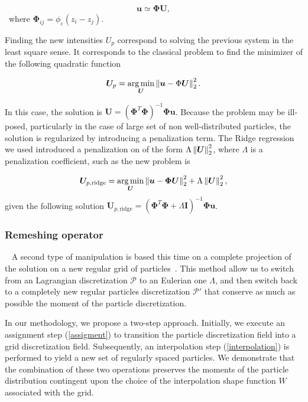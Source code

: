 \begin{equation*}
	\bm{u} \simeq \bm \Phi \bm{U},
\end{equation*}~where $\bm \Phi_{ij} = \phi_\varepsilon(z_i - z_j)$.

Finding the new intensities $U_p$ correspond to solving the previous system in the least square sense. It corresponds to the classical problem to find the minimizer of the following quadratic function

\begin{equation*}
	\bm{U}_p = \operatorname*{arg\,min}_{\bm{U}} \left\lVert \bm{u} - \Phi \bm{U} \right\rVert^2_2.
\end{equation*}


In this case, the solution is $\bm U = (\bm \Phi^T \bm \Phi)^{-1} \bm \Phi \bm{u}$. Because the problem may be ill-posed, particularly in the case of large set of non well-distributed particles, the solution is regularized by introducing a penalization term. The Ridge regression we used introduced a penalization on of the form $\Lambda \left\lVert \bm U \right\rVert_2^2$, where $\Lambda$ is a penalization coefficient, such as the new problem is

\begin{equation*}
	\bm{U}_{p,\text{ridge}} = \operatorname*{arg\,min}_{\bm{U}} \left\lVert \bm{u} - \bm \Phi \bm{U} \right\rVert_2^2 + \Lambda \left\lVert \bm{U} \right\rVert^2_2,
\end{equation*}given the following solution $\bm{U}_{p,\text{ridge}} = (\bm \Phi^T \bm \Phi + \Lambda \bm I)^{-1} \bm \Phi \bm{u}$.

\subsubsection{Remeshing operator}~\label{remesh_part}
A second type of manipulation is based this time on a complete projection of the solution on a new regular grid of particles~\cite{cottet_vortex_2000,cottet_multi-purpose_1999}. This method allow us to switch from an Lagrangian discretization $\mathcal P$ to an Eulerian one $\Lambda$, and then switch back to a completely new regular particles discretization $\mathcal P'$ that conserve as much as possible the moment of the particle discretization.

In our methodology, we propose a two-step approach. Initially, we execute an assignment step (\ref{assigment}) to transition the particle discretization field into a grid discretization field. Subsequently, an interpolation step (\ref{interpolation}) is performed to yield a new set of regularly spaced particles. We demonstrate that the combination of these two operations preserves the moments of the particle distribution contingent upon the choice of the interpolation shape function $W$ associated with the grid.

